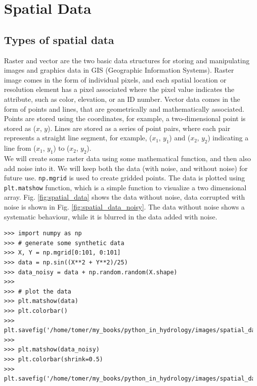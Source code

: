 \documentclass[10pt]{book}
\begin{document}
{\chapter{Spatial Data}
\section{Types of spatial data}
Raster and vector are the two basic data structures for storing and manipulating images and graphics data in GIS (Geographic Information Systems). Raster image comes in the form of individual pixels, and each spatial location or resolution element has a pixel associated where the pixel value indicates the attribute, such as color, elevation, or an ID number. Vector data comes in the form of points and lines, that are geometrically and mathematically associated. Points are stored using the coordinates, for example, a two-dimensional point is stored as ($x$, $y$). Lines are stored as a series of point pairs, where each pair represents a straight line segment, for example, ($x_1$, $y_1$) and ($x_2$, $y_2$) indicating a line from ($x_1$, $y_1$) to ($x_2$, $y_2$).\\

We will create some raster data using some mathematical function, and then also add noise into it. We will keep both the data (with noise, and without noise) for future use. \verb"np.mgrid" is used to create gridded points. The data is plotted using \verb"plt.matshow" function, which is a simple function to visualize a two dimensional array. Fig. \ref{fig:spatial_data} shows the data without noise, data corrupted with noise is shown in Fig. \ref{fig:spatial_data_noisy}. The data without noise shows a systematic behaviour, while it is blurred in the data added with noise.

\beforeverb \begin{verbatim}
>>> import numpy as np
>>> # generate some synthetic data
>>> X, Y = np.mgrid[0:101, 0:101]
>>> data = np.sin((X**2 + Y**2)/25) 
>>> data_noisy = data + np.random.random(X.shape)
>>>    
>>> # plot the data
>>> plt.matshow(data)
>>> plt.colorbar()
>>> plt.savefig('/home/tomer/my_books/python_in_hydrology/images/spatial_data.png')
>>> 
>>> plt.matshow(data_noisy)
>>> plt.colorbar(shrink=0.5)
>>> plt.savefig('/home/tomer/my_books/python_in_hydrology/images/spatial_data_noisy.png')
\end{verbatim} \afterverb

}
\end{document}
